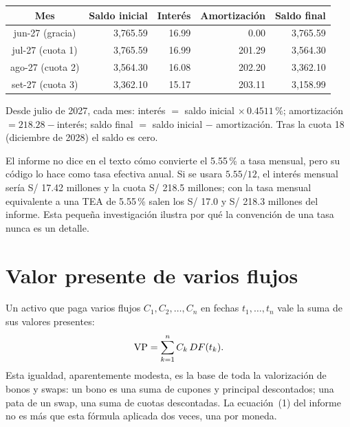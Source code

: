 \begin{center}\small
{}
\begin{tabular}{@{}crrrr@{}}
\toprule
Mes & Saldo inicial & Interés & Amortización & Saldo final\\
\midrule
jun-27 (gracia) & 3,765.59 & 16.99 & 0.00 & 3,765.59\\
jul-27 (cuota 1) & 3,765.59 & 16.99 & 201.29 & 3,564.30\\
ago-27 (cuota 2) & 3,564.30 & 16.08 & 202.20 & 3,362.10\\
set-27 (cuota 3) & 3,362.10 & 15.17 & 203.11 & 3,158.99\\
\bottomrule
\end{tabular}
\end{center}

Desde julio de 2027, cada mes: interés $=$ saldo inicial $\times\,0.4511\,\%$; amortización $=218.28-$interés; saldo final $=$ saldo inicial $-$ amortización. Tras la cuota 18 (diciembre de 2028) el saldo es cero.


\begin{adicional}
El informe no dice en el texto cómo convierte el 5.55\,\% a tasa mensual, pero su código lo hace como tasa efectiva anual. Si se usara $5.55/12$, el interés mensual sería S/ 17.42 millones y la cuota S/ 218.5 millones; con la tasa mensual equivalente a una TEA de 5.55\,\% salen los S/ 17.0 y S/ 218.3 millones del informe. Esta pequeña investigación ilustra por qué la convención de una tasa nunca es un detalle.
\end{adicional}

\section{Valor presente de varios flujos}

Un activo que paga varios flujos $C_1, C_2, \dots, C_n$ en fechas $t_1,\dots,t_n$ vale la suma de sus valores presentes:
\[ \operatorname{VP}=\sum_{k=1}^n C_k\,DF(t_k). \]
Esta igualdad, aparentemente modesta, es la base de toda la valorización de bonos y swaps: un bono es una suma de cupones y principal descontados; una pata de un swap, una suma de cuotas descontadas. La ecuación~(1) del informe no es más que esta fórmula aplicada dos veces, una por moneda.

